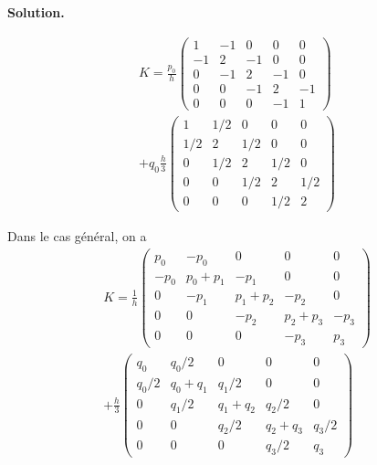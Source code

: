 \documentclass[11pt,a4paper]{report}
\newenvironment{solution}
{
    \vspace{0.5em}
    \begin{mdframed}[backgroundcolor=ThemeLight,leftmargin=0,rightmargin=0,skipabove=0.2em,skipbelow=0.2em]
    \textbf{Solution.}\\[0.5em]
}
{
    \end{mdframed}
    \vspace{0.5em}
}
\begin{document}
\begin{enumerate}[itemsep=0.5em]
{\begin{solution}
\begin{enumerate}
            \begin{multline*}
            K = \frac{p_0}{h}
            \begin{pmatrix}
                1 & -1 & 0 & 0 & 0\\
                -1 & 2 & -1 & 0 & 0\\
                0 & -1 & 2 & -1 & 0\\
                0 & 0 & -1 & 2 & -1\\
                0 & 0 & 0 & -1 & 1
            \end{pmatrix} \\ 
            + q_0 \frac{h}{3}
            \begin{pmatrix}
                1 & 1/2 & 0 & 0 & 0\\
                1/2 & 2 & 1/2 & 0 & 0\\
                0 & 1/2 & 2  & 1/2 & 0\\
                0 & 0 & 1/2 & 2 & 1/2\\
                0 & 0 & 0 & 1/2 & 2
            \end{pmatrix}
            \end{multline*}

            Dans le cas général, on a 
            \begin{multline*}
            K = \frac{1}{h}
            \begin{pmatrix}
                p_0 & -p_0 & 0 & 0 & 0\\
                -p_0 & p_0+p_1 & -p_1 & 0 & 0\\
                0 & -p_1 & p_1+p_2 & -p_2 & 0\\
                0 & 0 & -p_2 & p_2+p_3 & -p_3\\
                0 & 0 & 0 & -p_3 & p_3
            \end{pmatrix}\\
            + \frac{h}{3}
            \begin{pmatrix}
                q_0 & q_0/2 & 0 & 0 & 0\\
                q_0/2 & q_0+q_1 & q_1/2 & 0 & 0\\
                0 & q_1/2 & q_1+q_2 & q_2/2 & 0\\
                0 & 0 & q_2/2 & q_2+q_3 & q_3/2\\
                0 & 0 & 0 & q_3/2 & q_3
            \end{pmatrix}
            \end{multline*}


\end{enumerate}
\end{solution}}
\end{enumerate}
\end{document}
